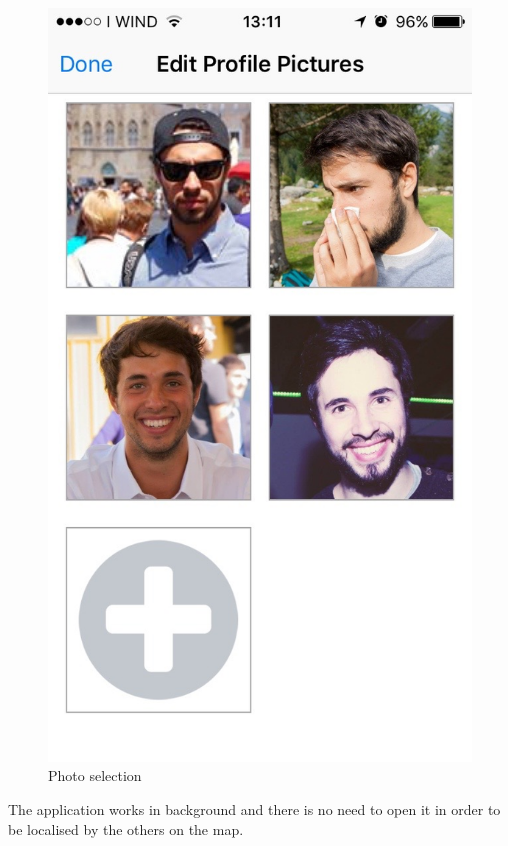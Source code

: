 \begin{multicols}{2}
\begin{figure}[H]
\centering
\includegraphics[scale=0.15]{./images/photo_selection.jpg}
\caption{\label{Augmented reality Experience}Photo selection}
\end{figure}
\end{multicols}

The application works in background and there is no need to open it in order to be localised by the others on the map.


